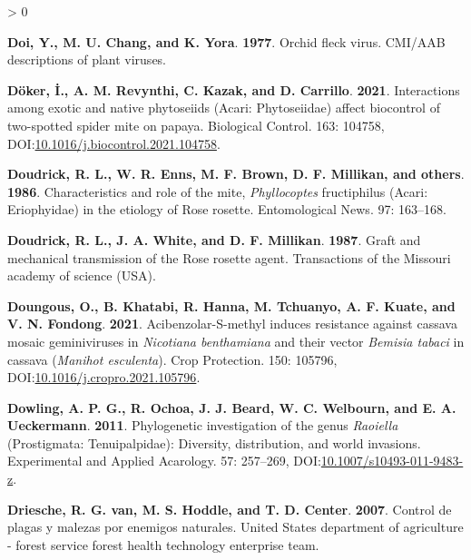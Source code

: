 \documentclass{ufdissertation}[overrideChapters] %
\newlength{\cslhangindent}
\newenvironment{CSLReferences}[2] %
 {%
  \setlength{\parindent}{0pt}
  \ifodd #1 \everypar{\setlength{\hangindent}{\cslhangindent}}\ignorespaces\fi
  \ifnum #2 > 0
  \setlength{\parskip}{#2\baselineskip}
  \fi
 }%
 {}
\begin{document}
{\begin{CSLReferences}{1}{1}
\leavevmode{}%
\textbf{Doi, Y., M. U. Chang, and K. Yora}. \textbf{1977}. Orchid fleck virus. {CMI/AAB} descriptions of plant viruses.

\leavevmode{}%
\textbf{Döker, İ., A. M. Revynthi, C. Kazak, and D. Carrillo}. \textbf{2021}. Interactions among exotic and native phytoseiids ({Acari}: {Phytoseiidae}) affect biocontrol of two-spotted spider mite on papaya. Biological Control. 163: 104758, DOI:\href{https://doi.org/10.1016/j.biocontrol.2021.104758}{10.1016/j.biocontrol.2021.104758}.

\leavevmode{}%
\textbf{Doudrick, R. L., W. R. Enns, M. F. Brown, D. F. Millikan, and others}. \textbf{1986}. Characteristics and role of the mite, {\emph{Phyllocoptes} fructiphilus} ({Acari}: {Eriophyidae}) in the etiology of {Rose rosette}. Entomological News. 97: 163--168.

\leavevmode{}%
\textbf{Doudrick, R. L., J. A. White, and D. F. Millikan}. \textbf{1987}. Graft and mechanical transmission of the {Rose rosette} agent. Transactions of the {Missouri} academy of science {(USA)}.

\leavevmode{}%
\textbf{Doungous, O., B. Khatabi, R. Hanna, M. Tchuanyo, A. F. Kuate, and V. N. Fondong}. \textbf{2021}. Acibenzolar-{S}-methyl induces resistance against cassava mosaic geminiviruses in {\emph{Nicotiana benthamiana}} and their vector {\emph{Bemisia tabaci}} in cassava ({\emph{Manihot esculenta}}). Crop Protection. 150: 105796, DOI:\href{https://doi.org/10.1016/j.cropro.2021.105796}{10.1016/j.cropro.2021.105796}.

\leavevmode{}%
\textbf{Dowling, A. P. G., R. Ochoa, J. J. Beard, W. C. Welbourn, and E. A. Ueckermann}. \textbf{2011}. Phylogenetic investigation of the genus {\emph{Raoiella}} ({Prostigmata}: {Tenuipalpidae}): Diversity, distribution, and world invasions. Experimental and Applied Acarology. 57: 257--269, DOI:\href{https://doi.org/10.1007/s10493-011-9483-z}{10.1007/s10493-011-9483-z}.

\leavevmode{}%
\textbf{Driesche, R. G. van, M. S. Hoddle, and T. D. Center}. \textbf{2007}. Control de plagas y malezas por enemigos naturales. {United States} department of agriculture - forest service forest health technology enterprise team.


\end{CSLReferences}}
\end{document}
